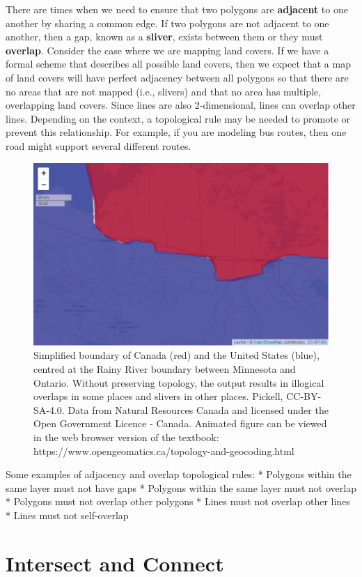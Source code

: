 \documentclass[
]{book}
\begin{document}
There are times when we need to ensure that two polygons are \textbf{adjacent} to one another by sharing a common edge. If two polygons are not adjacent to one another, then a gap, known as a \textbf{sliver}, exists between them or they must \textbf{overlap}. Consider the case where we are mapping land covers. If we have a formal scheme that describes all possible land covers, then we expect that a map of land covers will have perfect adjacency between all polygons so that there are no areas that are not mapped (i.e., slivers) and that no area has multiple, overlapping land covers. Since lines are also 2-dimensional, lines can overlap other lines. Depending on the context, a topological rule may be needed to promote or prevent this relationship. For example, if you are modeling bus routes, then one road might support several different routes.

\begin{figure}
\includegraphics[width=0.75\linewidth]{images/07-Canada-US-border-simplified-leaflet} \caption{Simplified boundary of Canada (red) and the United States (blue), centred at the Rainy River boundary between Minnesota and Ontario. Without preserving topology, the output results in illogical overlaps in some places and slivers in other places. Pickell, CC-BY-SA-4.0. Data from Natural Resources Canada and licensed under the Open Government Licence - Canada. Animated figure can be viewed in the web browser version of the textbook: https://www.opengeomatics.ca/topology-and-geocoding.html}\label{fig:unnamed-chunk-23}
\end{figure}

Some examples of adjacency and overlap topological rules:
* Polygons within the same layer must not have gaps
* Polygons within the same layer must not overlap
* Polygons must not overlap other polygons
* Lines must not overlap other lines
* Lines must not self-overlap

\hypertarget{intersect-and-connect}{%
\section{Intersect and Connect}\label{intersect-and-connect}}
\end{document}
